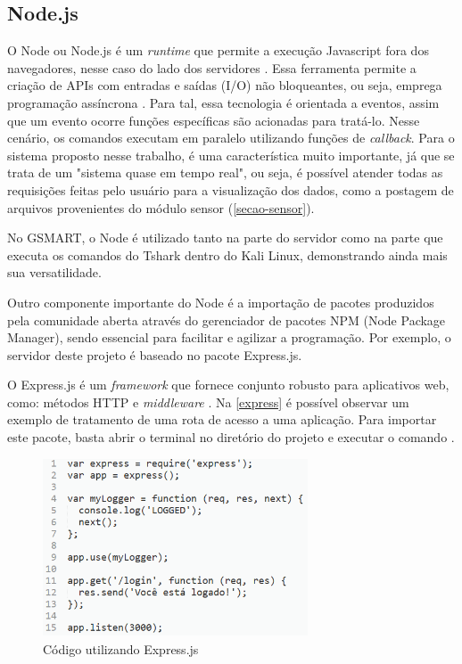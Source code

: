 \subsection{Node.js}
O Node ou Node.js é um \emph{runtime} que permite a execução Javascript fora dos navegadores, nesse caso do lado dos servidores \cite{node}.
Essa ferramenta permite a criação de APIs com entradas e saídas (I/O) não bloqueantes, ou seja, emprega programação assíncrona \cite{Dzone}. Para tal, essa tecnologia é orientada a eventos, assim que um evento ocorre funções específicas são
acionadas para tratá-lo. Nesse cenário, os comandos executam em paralelo utilizando funções de \emph{callback}. Para o sistema proposto nesse trabalho, é uma característica muito importante, já que se trata de um "sistema quase em tempo real", ou seja, é possível atender todas as requisições feitas pelo usuário para a visualização dos dados, como
a postagem de arquivos provenientes do módulo sensor (\autoref{secao-sensor}).

No GSMART, o Node é utilizado tanto na parte do servidor como na parte que executa os comandos do Tshark dentro do Kali Linux, demonstrando ainda mais sua versatilidade.

Outro componente importante do Node é a importação de pacotes produzidos pela comunidade aberta através do gerenciador de pacotes NPM (Node
Package Manager), sendo essencial para facilitar e agilizar a programação. Por exemplo, o servidor deste projeto é baseado no pacote Express.js.

O Express.js é um \emph{framework} que fornece conjunto robusto para aplicativos
web, como: métodos HTTP e \emph{middleware} \cite{express}. Na \autoref{express} é
possível observar um exemplo de tratamento de uma rota de acesso a uma aplicação.
Para importar este pacote, basta abrir o terminal no diretório do projeto e executar o comando
.

\begin{figure}[htb]
  \caption{\label{express}Código utilizando Express.js}
  \begin{center}
    \includegraphics[width=0.70\textwidth]{img/express.png}
  \end{center}
\end{figure}

